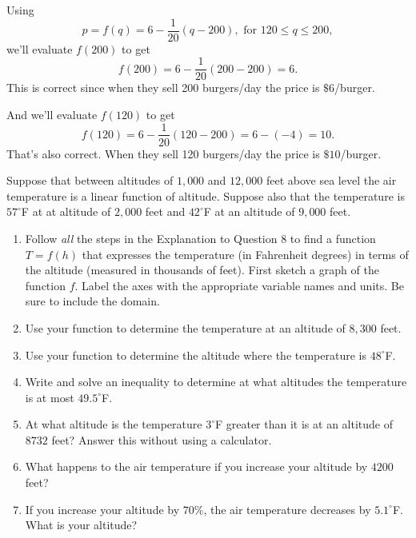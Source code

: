 \documentclass{ximera}
\begin{document}
\begin{example}
\begin{explanation}
\begin{enumerate}
Using
\[
  p = f(q) = 6 - \frac{1}{20} \left( q - 200 \right) , \text{ for } 120\leq q \leq 200 , 
\]
we'll evaluate $f(200)$ to get
\[
    f(200) = 6 - \frac{1}{20} \left( 200 - 200 \right) =6 .
\]
This is correct since when they sell 200 burgers/day the price is $\$6$/burger.

And we'll evaluate $f(120)$ to get
\[
  f(120) = 6 - \frac{1}{20} \left( 120 - 200 \right)  = 6 - (-4) = 10 .
\]
That's also correct. When they sell 120 burgers/day the price is $\$10$/burger.

\end{enumerate}
\end{explanation}
\end{example}



\begin{question}   \label{Qdfsdfbbhhh}
Suppose that between altitudes of $1,000$ and $12,000$ feet above sea level the air temperature is a linear function of altitude. Suppose also that the temperature is $57^\circ$F at at altitude of $2,000$ feet and $42^\circ$F at an altitude of $9,000$ feet.

\begin{enumerate}
\item Follow \emph{all} the steps in the Explanation to Question 8 to find a function $T = f(h)$ that expresses the temperature (in Fahrenheit degrees) in terms of the altitude (measured in thousands of feet). First sketch a graph of the function $f$. Label the axes with the appropriate variable names and units. Be sure to include the domain.

\item Use your function to determine the temperature at an altitude of $8,300$ feet.

\item Use your function to determine the altitude where the temperature is $48^\circ$F.

\item Write and solve an inequality to determine at what altitudes the temperature is at most $49.5^\circ$F.

\item At what altitude is the temperature $3^\circ$F greater than it is at an altitude of $8732$ feet? Answer this without using a calculator.

\item What happens to the air temperature if you increase your altitude by $4200$ feet?

\item If you increase your altitude by $70\%$, the air temperature decreases by $5.1^\circ$F. What is your altitude?

\end{enumerate}
\end{question}
\end{document}

